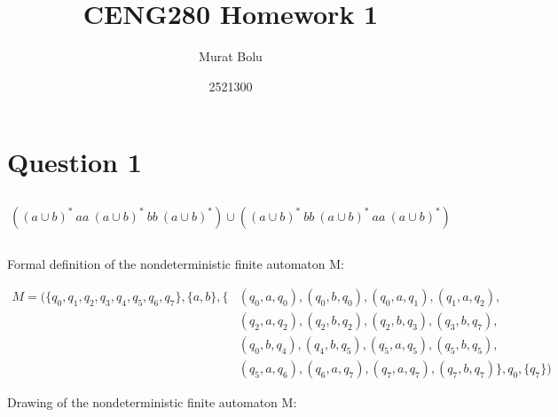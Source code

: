 \documentclass[12pt]{article}
\title{CENG280 Homework 1}
\author{Murat Bolu}
\date{2521300}
\begin{document}
\maketitle

\section{Question 1}

\subsection{}
\begin{equation*}
((a \cup b)^*\ aa\ (a \cup b)^*\ bb\ (a \cup b)^*) \cup ((a \cup b)^*\ bb\ (a \cup b)^*\ aa\ (a \cup b)^*)
\end{equation*}

\subsection{}
\begin{center}
Formal definition of the nondeterministic finite automaton M:
\end{center}
\begin{align*}
M = (\{q_0,q_1,q_2,q_3,q_4,q_5,q_6,q_7\},\{a,b\}, \{&(q_0, a, q_0), (q_0, b, q_0), (q_0, a, q_1), (q_1, a, q_2), \\
&(q_2, a, q_2), (q_2, b, q_2), (q_2, b, q_3), (q_3, b, q_7), \\
&(q_0, b, q_4), (q_4, b, q_5), (q_5, a, q_5), (q_5, b, q_5), \\
&(q_5, a, q_6), (q_6, a, q_7), (q_7, a, q_7), (q_7, b, q_7)\}, q_0, \{q_7\})
\end{align*}

\newpage

\begin{center}
Drawing of the nondeterministic finite automaton M:
\end{center}
\end{document}
